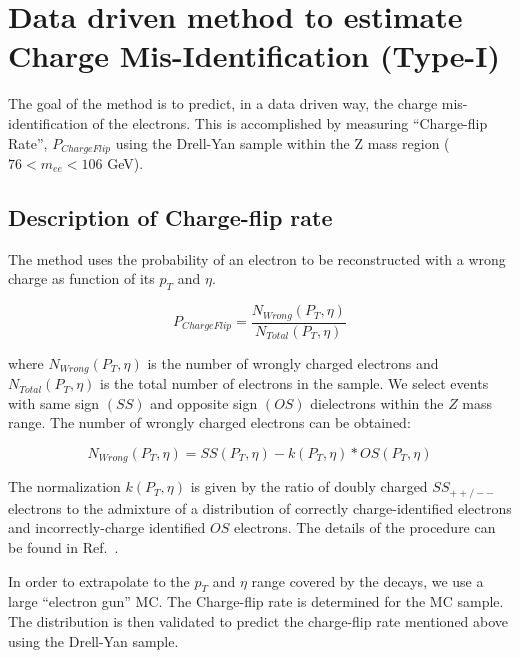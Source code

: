 \section{Data driven method to estimate Charge Mis-Identification (Type-I)}
\label{sec:chargemisid}

The goal of the method is to predict, in a data driven way, the charge 
mis-identification of the electrons. This is accomplished
by measuring ``Charge-flip Rate'', $P_{ChargeFlip}$ using the Drell-Yan sample within the Z mass region
($76 < m_{ee} < 106 $ GeV). 

\subsection{Description of Charge-flip rate}

The method uses the probability of an electron to be reconstructed 
with a wrong charge as function of its $p_T$ and $\eta$.

\begin{equation}
P_{ChargeFlip} = \frac{N_{Wrong}(P_T, \eta)}{N_{Total}(P_T, \eta)}
\end{equation}

where $N_{Wrong}(P_T, \eta)$ is the number of wrongly charged electrons  and $N_{Total}(P_T, \eta)$ is 
the total number of electrons in the sample. We select events with same sign $(SS)$ 
and opposite sign $(OS)$ dielectrons within the $Z$ mass range. The number of wrongly 
charged electrons can be obtained:

\begin{equation}
  N_{Wrong}(P_T, \eta) = SS(P_T, \eta) - k(P_T, \eta) * OS(P_T, \eta) 
\end{equation}

The normalization $k(P_T, \eta)$ is given by the ratio of doubly charged $SS_{++/--}$ electrons to the 
admixture of a distribution of correctly charge-identified electrons and incorrectly-charge 
identified $OS$ electrons. The details of the procedure can be found in Ref.~\cite{chargefake}. 

In order to extrapolate to the $p_T$ and $\eta$ range covered by the \ttbar decays, we use a 
large ``electron gun'' MC. The Charge-flip rate is determined for the MC sample. The 
distribution is then validated to predict the charge-flip rate mentioned above 
using the Drell-Yan sample.

